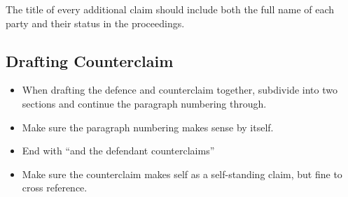 \documentclass[
]{article}
\providecommand{\tightlist}{%
  \setlength{\itemsep}{0pt}\setlength{\parskip}{0pt}}
\begin{document}
The title of every additional claim should include both the full name of
each party and their status in the proceedings.

\hypertarget{drafting-counterclaim}{%
\subsection{Drafting Counterclaim}\label{drafting-counterclaim}}

\begin{itemize}
\tightlist
\item
  When drafting the defence and counterclaim together, subdivide into
  two sections and continue the paragraph numbering through.
\item
  Make sure the paragraph numbering makes sense by itself.
\item
  End with ``and the defendant counterclaims''
\item
  Make sure the counterclaim makes self as a self-standing claim, but
  fine to cross reference.
\end{itemize}
\end{document}
